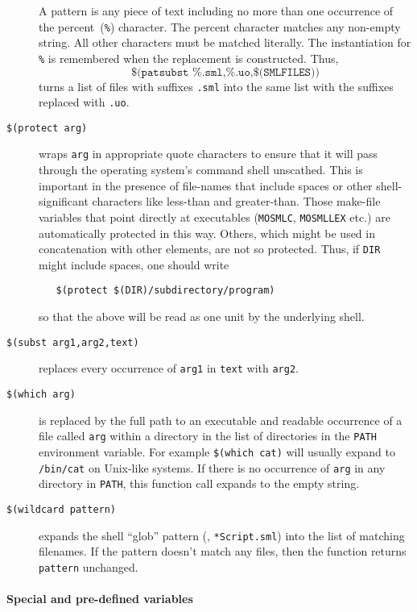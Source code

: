 \begin{description}
  A pattern is any piece of text including no more than one occurrence
  of the percent~(\texttt{\%}) character.  The percent character
  matches any non-empty string.  All other characters must be matched
  literally.  The instantiation for \texttt{\%} is remembered when the
  replacement is constructed.  Thus, \[
    \texttt{\$(patsubst \%.sml,\%.uo,\$(SMLFILES))}
   \] turns a list of files with suffixes \texttt{.sml} into the same
  list with the suffixes replaced with \texttt{.uo}.
\item[\texttt{\$(protect arg)}] wraps \texttt{arg} in appropriate
  quote characters to ensure that it will pass through the operating
  system's command shell unscathed.  This is important in the presence
  of file-names that include spaces or other shell-significant
  characters like less-than and greater-than.  Those make-file
  variables that point directly at executables (\texttt{MOSMLC},
  \texttt{MOSMLLEX} etc.) are automatically protected in this way.
  Others, which might be used in concatenation with other elements,
  are not so protected.  Thus, if \texttt{DIR} might include spaces,
  one should write
\begin{verbatim}
   $(protect $(DIR)/subdirectory/program)
\end{verbatim}
  so that the above will be read as one unit by the underlying shell.
\item[\texttt{\$(subst arg1,arg2,text)}] replaces every occurrence
  of \texttt{arg1} in \texttt{text} with \texttt{arg2}.
\item[\texttt{\$(which arg)}] is replaced by the full path to an executable and readable occurrence of a file called \texttt{arg} within a directory in the list of directories in the \texttt{PATH} environment variable.
For example \texttt{\$(which cat)} will usually expand to \texttt{/bin/cat} on Unix-like systems.
If there is no occurrence of \texttt{arg} in any directory in \texttt{PATH}, this function call expands to the empty string.
\item[\texttt{\$(wildcard pattern)}] expands the shell ``glob'' pattern (\eg, \texttt{*Script.sml}) into the list of matching filenames.
If the pattern doesn't match any files, then the function returns \texttt{pattern} unchanged.
\end{description}

\paragraph{Special and pre-defined variables}

